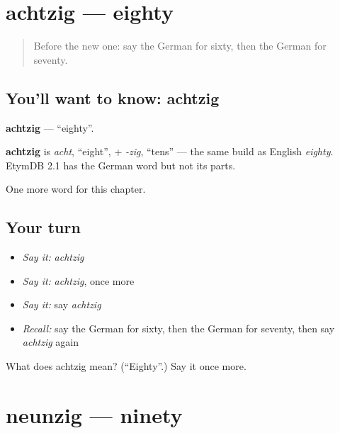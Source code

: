 \section[achtzig]{achtzig — eighty}

\label{lesson:GE-C138-achtzig}



\begin{quote}
Before the new one: say the German for sixty, then the German for seventy.
\end{quote}

\subsection*{You'll want to know: achtzig}
\textbf{achtzig} — \textquotedblleft{}eighty\textquotedblright{}.

\begin{cousinweb}
\textbf{achtzig} is \emph{acht}, \textquotedblleft{}eight\textquotedblright{}, + \emph{-zig}, \textquotedblleft{}tens\textquotedblright{} — the same build as English \emph{eighty}. EtymDB 2.1 has the German word but not its parts.
\end{cousinweb}

\begin{grammarlens}[title={What you've built}]
One more word for this chapter.
\end{grammarlens}

\subsection*{Your turn}
\begin{itemize}
\raggedright
  \item \emph{Say it:} \emph{achtzig}
  \item \emph{Say it:} \emph{achtzig}, once more
  \item \emph{Say it:} say \emph{achtzig}
  \item \emph{Recall:} say the German for sixty, then the German for seventy, then say \emph{achtzig} again
\end{itemize}

\begin{tcolorbox}[breakable,colback=teal!4,colframe=teal!35!black,title={Before you move on}]
What does achtzig mean? (\textquotedblleft{}Eighty\textquotedblright{}.) Say it once more.
\end{tcolorbox}
\section[neunzig]{neunzig — ninety}

